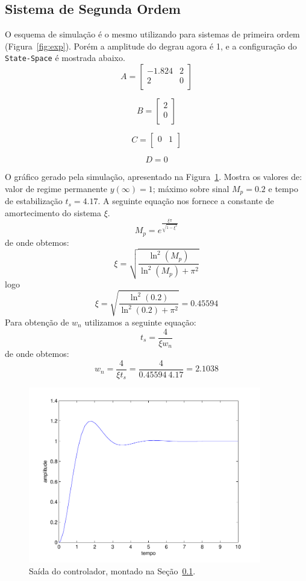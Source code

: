 \documentclass[a4paper]{article}
\begin{document}
\subsection{Sistema de Segunda Ordem}\label{sec:exp2}
O esquema de simulação é o mesmo utilizando para sistemas de primeira ordem (Figura~\ref{fig:exp}).
Porém a amplitude do degrau agora é 1, e a configuração do \verb.State-Space. é mostrada abaixo.
$$A=
\begin{bmatrix}
-1.824 & 2 \\
2      & 0 \\
\end{bmatrix}$$

$$B=
\begin{bmatrix}
2 \\
0 \\
\end{bmatrix}$$

$$C=
\begin{bmatrix}
0 & 1 \\
\end{bmatrix}$$

$$D=0$$

O gráfico gerado pela simulação, apresentado na Figura~\ref{fig:exp2_simulado}.
Mostra os valores de: valor de regime permanente $y(\infty)=1$; máximo sobre
sinal $M_p=0.2$ e tempo de estabilização $t_s=4.17$. A seguinte equação nos
fornece a constante de amortecimento do sistema $\xi$.
$$M_p=e^{\frac{\xi\pi}{\sqrt{1-\xi^2}}}$$
de onde obtemos:
$$\xi=\sqrt{\frac{\ln^2(M_p)}{\ln^2(M_p)+\pi^2}}$$
logo
$$\xi=\sqrt{\frac{\ln^2(0.2)}{\ln^2(0.2)+\pi^2}}=0.45594$$
Para obtenção de $w_n$ utilizamos a seguinte equação:
$$t_s=\frac{4}{\xi w_n}$$
de onde obtemos:
$$w_n=\frac{4}{\xi t_s}=\frac{4}{0.45594~4.17}=2.1038$$


\begin{figure}[h]
   \centering
   \includegraphics[width=4in]{exp2_simulado}
   \caption{Saída do controlador, montado na Seção~\ref{sec:exp2}.}
   \label{fig:exp2_simulado}
\end{figure}



 
\end{document}
